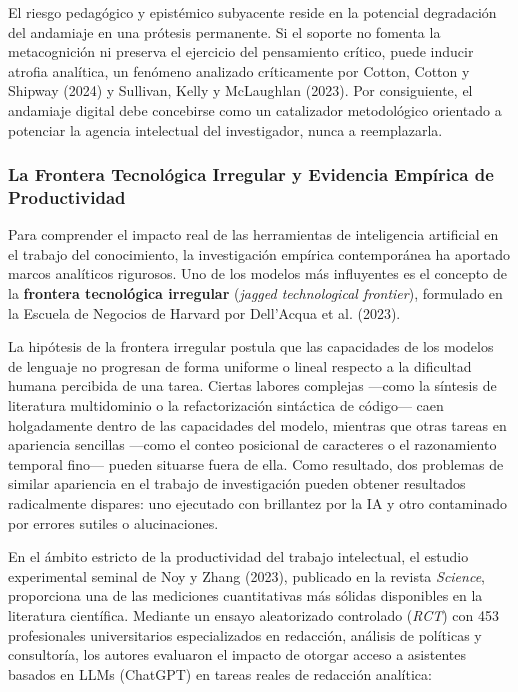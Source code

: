 El riesgo pedagógico y epistémico subyacente reside en la potencial degradación del andamiaje en una prótesis permanente. Si el soporte no fomenta la metacognición ni preserva el ejercicio del pensamiento crítico, puede inducir atrofia analítica, un fenómeno analizado críticamente por Cotton, Cotton y Shipway (2024) y Sullivan, Kelly y McLaughlan (2023). Por consiguiente, el andamiaje digital debe concebirse como un catalizador metodológico orientado a potenciar la agencia intelectual del investigador, nunca a reemplazarla.

\subsubsection{La Frontera Tecnológica Irregular y Evidencia Empírica de Productividad}

Para comprender el impacto real de las herramientas de inteligencia artificial en el trabajo del conocimiento, la investigación empírica contemporánea ha aportado marcos analíticos rigurosos. Uno de los modelos más influyentes es el concepto de la \textbf{frontera tecnológica irregular} (\textit{jagged technological frontier}), formulado en la Escuela de Negocios de Harvard por Dell'Acqua et al. (2023).

La hipótesis de la frontera irregular postula que las capacidades de los modelos de lenguaje no progresan de forma uniforme o lineal respecto a la dificultad humana percibida de una tarea. Ciertas labores complejas ---como la síntesis de literatura multidominio o la refactorización sintáctica de código--- caen holgadamente dentro de las capacidades del modelo, mientras que otras tareas en apariencia sencillas ---como el conteo posicional de caracteres o el razonamiento temporal fino--- pueden situarse fuera de ella. Como resultado, dos problemas de similar apariencia en el trabajo de investigación pueden obtener resultados radicalmente dispares: uno ejecutado con brillantez por la IA y otro contaminado por errores sutiles o alucinaciones.

En el ámbito estricto de la productividad del trabajo intelectual, el estudio experimental seminal de Noy y Zhang (2023), publicado en la revista \textit{Science}, proporciona una de las mediciones cuantitativas más sólidas disponibles en la literatura científica. Mediante un ensayo aleatorizado controlado (\textit{RCT}) con 453 profesionales universitarios especializados en redacción, análisis de políticas y consultoría, los autores evaluaron el impacto de otorgar acceso a asistentes basados en LLMs (ChatGPT) en tareas reales de redacción analítica:

